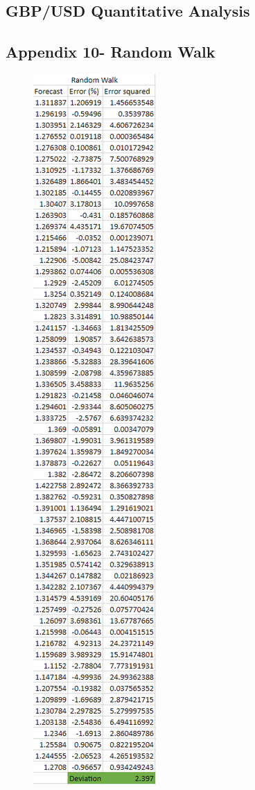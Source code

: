 \documentclass{article}
\let\Oldsubsection\subsection
\renewcommand{\subsection}{\FloatBarrier\Oldsubsection}
\begin{document}
\subsection*{GBP/USD Quantitative Analysis}

\subsection*{Appendix 10- Random Walk}


\begin{figure}[h!]
    \centering
    \includegraphics[scale=0.5]{graphs/app10.png}
\end{figure}
\end{document}
